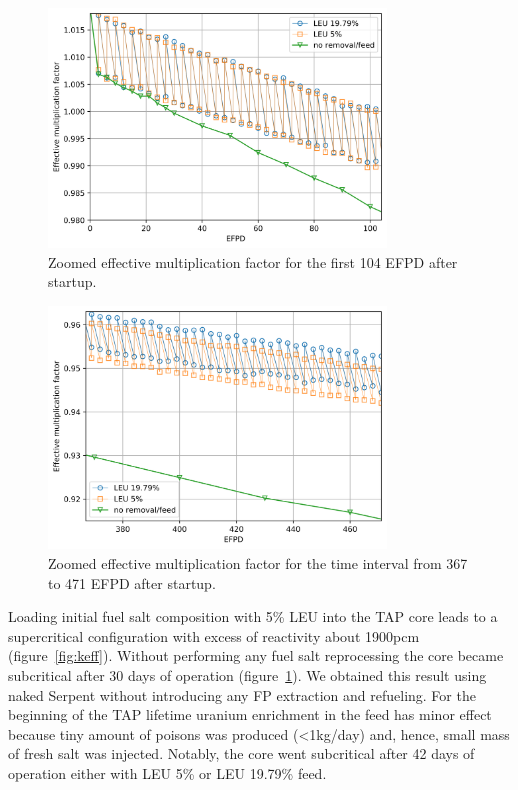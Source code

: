 \documentclass[12pt]{article} %
\begin{document}
\begin{figure}[htp!] %
  \centering
		  \includegraphics[width=0.8\textwidth]{keff_zoomed_1.png}
	  \vspace{-0.4in}
  \caption{Zoomed effective multiplication factor for the first 104 EFPD 
  after startup.}
  \label{fig:keff-zoomed}
\end{figure}
\begin{figure}[htp!] %
  \centering
		  \includegraphics[width=0.8\textwidth]{keff_zoomed_2.png}
	 \vspace{-0.4in}
  \caption{Zoomed effective multiplication factor for the time interval 
  from 367 to 471 EFPD after startup.}
  \label{fig:keff-zoomed-2}
\end{figure}

Loading initial fuel salt composition with 5\% \gls{LEU} into the \gls{TAP} 
core leads to a supercritical configuration with excess of reactivity about 
1900pcm (figure~\ref{fig:keff}). Without performing any fuel salt reprocessing 
the core became subcritical after 30 days of operation (figure~\ref{fig:keff-zoomed}). 
We obtained this result using naked Serpent without introducing any \gls{FP} extraction 
and refueling. For the beginning of the \gls{TAP} lifetime uranium enrichment in the 
feed has minor effect because tiny amount of poisons was produced (<1kg/day) and, 
hence, small mass of fresh salt was injected. Notably, the core went subcritical after 
42 days of operation either with \gls{LEU} 5\% or \gls{LEU} 19.79\% feed.
\end{document}
